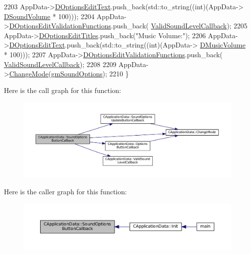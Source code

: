 \begin{DoxyCode}
2203     AppData->\hyperlink{classCApplicationData_a7044dc34cbd9d6776e8ef79eb12b5ce4}{DOptionsEditText}.push\_back(std::to\_string((\textcolor{keywordtype}{int})(AppData->
      \hyperlink{classCApplicationData_aa6e540f860dcb1929ef36ddce3be3691}{DSoundVolume} * 100)));
2204     AppData->\hyperlink{classCApplicationData_ab76fa444142de66fdb058f390e01112c}{DOptionsEditValidationFunctions}.push\_back(
      \hyperlink{classCApplicationData_ae3216a4fccd68c9657d7e936b1a6df67}{ValidSoundLevelCallback});
2205     AppData->\hyperlink{classCApplicationData_a7a322ef6b8c1db3e995c6b493230fd05}{DOptionsEditTitles}.push\_back(\textcolor{stringliteral}{"Music Volume:"});
2206     AppData->\hyperlink{classCApplicationData_a7044dc34cbd9d6776e8ef79eb12b5ce4}{DOptionsEditText}.push\_back(std::to\_string((\textcolor{keywordtype}{int})(AppData->
      \hyperlink{classCApplicationData_a8bc61af4a83a667102e55cca2a739c3b}{DMusicVolume} * 100)));
2207     AppData->\hyperlink{classCApplicationData_ab76fa444142de66fdb058f390e01112c}{DOptionsEditValidationFunctions}.push\_back(
      \hyperlink{classCApplicationData_ae3216a4fccd68c9657d7e936b1a6df67}{ValidSoundLevelCallback});
2208     
2209     AppData->\hyperlink{classCApplicationData_aee18c113e9a0acb3cad3d63eb19de71b}{ChangeMode}(\hyperlink{classCApplicationData_ac8ac37a4c8bb871036fbbdc6a072e403a3b63571023293bc10198d9128b5b8a16}{gmSoundOptions});
2210 \}
\end{DoxyCode}
Here is the call graph for this function\+:\nopagebreak
\begin{figure}[H]
\begin{center}
\leavevmode
\includegraphics[width=350pt]{classCApplicationData_a7169395ea835eaa9c98188d1b3583534_cgraph}
\end{center}
\end{figure}
Here is the caller graph for this function\+:\nopagebreak
\begin{figure}[H]
\begin{center}
\leavevmode
\includegraphics[width=350pt]{classCApplicationData_a7169395ea835eaa9c98188d1b3583534_icgraph}
\end{center}
\end{figure}
